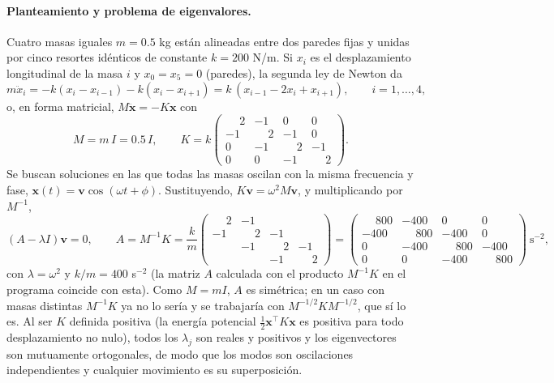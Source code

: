 \documentclass[11pt,a4paper]{article}
\newcommand{\vect}[1]{\bm{#1}}
\begin{document}
\paragraph{Planteamiento y problema de eigenvalores.}
Cuatro masas iguales $m=0.5$ kg están alineadas entre dos paredes fijas y unidas por cinco resortes idénticos de constante $k=200$ N/m. Si $x_i$ es el desplazamiento longitudinal de la masa $i$ y $x_0=x_5=0$ (paredes), la segunda ley de Newton da
\[
m\ddot x_i=-k(x_i-x_{i-1})-k(x_i-x_{i+1})=k\,(x_{i-1}-2x_i+x_{i+1}),\qquad i=1,\dots,4,
\]
o, en forma matricial, $M\ddot{\vect x}=-K\vect x$ con
\[
M=m\,I=0.5\,I,\qquad K=k\begin{pmatrix}\phantom{-}2&-1&0&0\\-1&\phantom{-}2&-1&0\\0&-1&\phantom{-}2&-1\\0&0&-1&\phantom{-}2\end{pmatrix}.
\]
Se buscan soluciones en las que todas las masas oscilan con la misma frecuencia y fase, $\vect x(t)=\vect v\cos(\omega t+\phi)$. Sustituyendo, $K\vect v=\omega^2M\vect v$, y multiplicando por $M^{-1}$,
\begin{equation}
(A-\lambda I)\vect v=0,\qquad A=M^{-1}K=\frac km\begin{pmatrix}\phantom{-}2&-1&&\\-1&\phantom{-}2&-1&\\&-1&\phantom{-}2&-1\\&&-1&\phantom{-}2\end{pmatrix}=\begin{pmatrix}\phantom{-}800&-400&0&0\\-400&\phantom{-}800&-400&0\\0&-400&\phantom{-}800&-400\\0&0&-400&\phantom{-}800\end{pmatrix}\ \mathrm{s^{-2}}, \label{eq:A}
\end{equation}
con $\lambda=\omega^2$ y $k/m=400$ s$^{-2}$ (la matriz $A$ calculada con el producto $M^{-1}K$ en el programa coincide con esta). Como $M=mI$, $A$ es simétrica; en un caso con masas distintas $M^{-1}K$ ya no lo sería y se trabajaría con $M^{-1/2}KM^{-1/2}$, que sí lo es. Al ser $K$ definida positiva (la energía potencial $\tfrac12\vect x^\top K\vect x$ es positiva para todo desplazamiento no nulo), todos los $\lambda_j$ son reales y positivos y los eigenvectores son mutuamente ortogonales, de modo que los modos son oscilaciones independientes y cualquier movimiento es su superposición.
\end{document}
